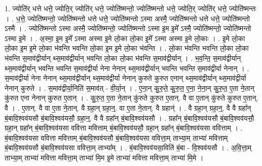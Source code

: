 \documentclass[17pt]{extarticle}
\begin{document}
1. ज्योति॑र् धत्ते धत्ते॒ ज्योति॒र् ज्योति॑र् धत्ते॒ ज्योति॑ष्मन्तो॒ ज्योति॑ष्मन्तो धत्ते॒ ज्योति॒र् ज्योति॑र् धत्ते॒ ज्योति॑ष्मन्तः । . ध॒त्ते॒ ज्योति॑ष्मन्तो॒ ज्योति॑ष्मन्तो धत्ते धत्ते॒ ज्योति॑ष्मन्तो ऽस्मा अस्मै॒ ज्योति॑ष्मन्तो धत्ते धत्ते॒ ज्योति॑ष्मन्तो ऽस्मै । . ज्योति॑ष्मन्तो ऽस्मा अस्मै॒ ज्योति॑ष्मन्तो॒ ज्योति॑ष्मन्तो ऽस्मा इ॒म इ॒मे᳚ ऽस्मै॒ ज्योति॑ष्मन्तो॒ ज्योति॑ष्मन्तो ऽस्मा इ॒मे । . अ॒स्मा॒ इ॒म इ॒मे᳚ ऽस्मा अस्मा इ॒मे लो॒का लो॒का इ॒मे᳚ ऽस्मा अस्मा इ॒मे लो॒काः । . इ॒मे लो॒का लो॒का इ॒म इ॒मे लो॒का भ॑वन्ति भवन्ति लो॒का इ॒म इ॒मे लो॒का भ॑वन्ति । . लो॒का भ॑वन्ति भवन्ति लो॒का लो॒का भ॑वन्ति स॒माव॑द्वीर्यान् थ्स॒माव॑द्वीर्यान् भवन्ति लो॒का लो॒का भ॑वन्ति स॒माव॑द्वीर्यान् । . भ॒व॒न्ति॒ स॒माव॑द्वीर्यान् थ्स॒माव॑द्वीर्यान् भवन्ति भवन्ति स॒माव॑द्वीर्या नेना नेनान् थ्स॒माव॑द्वीर्यान् भवन्ति भवन्ति स॒माव॑द्वीर्या नेनान् । . स॒माव॑द्वीर्या नेना नेनान् थ्स॒माव॑द्वीर्यान् थ्स॒माव॑द्वीर्या नेनान् कुरुते कुरुत एनान् थ्स॒माव॑द्वीर्यान् थ्स॒माव॑द्वीर्या नेनान् कुरुते । . स॒माव॑द्वीर्या॒निति॑ स॒माव॑त् - वी॒र्या॒न् । . ए॒ना॒न् कु॒रु॒ते॒ कु॒रु॒त॒ ए॒ना॒ ने॒ना॒न् कु॒रु॒त॒ ए॒ता ने॒तान् कु॑रुत एना नेनान् कुरुत ए॒तान् । . कु॒रु॒त॒ ए॒ता ने॒तान् कु॑रुते कुरुत ए॒तान्. वै वा ए॒तान् कु॑रुते कुरुत ए॒तान्. वै । . ए॒तान्. वै वा ए॒ता ने॒तान्. वै ग्रहा॒न् ग्रहा॒न्॒. वा ए॒ता ने॒तान्. वै ग्रहान्॑ । . वै ग्रहा॒न् ग्रहा॒न्॒. वै वै ग्रहा᳚न् बं॒बावि॒श्वव॑यसौ बं॒बावि॒श्वव॑यसौ॒ ग्रहा॒न्॒. वै वै ग्रहा᳚न् बं॒बावि॒श्वव॑यसौ । . ग्रहा᳚न् बं॒बावि॒श्वव॑यसौ बं॒बावि॒श्वव॑यसौ॒ ग्रहा॒न् ग्रहा᳚न् बं॒बावि॒श्वव॑यसा ववित्ता मवित्ताम् बं॒बावि॒श्वव॑यसौ॒ ग्रहा॒न् ग्रहा᳚न् बं॒बावि॒श्वव॑यसा ववित्ताम् । . बं॒बावि॒श्वव॑यसा ववित्ता मवित्ताम् बं॒बावि॒श्वव॑यसौ बं॒बावि॒श्वव॑यसा ववित्ता॒म् ताभ्या॒म् ताभ्या॑ मवित्ताम् बं॒बावि॒श्वव॑यसौ बं॒बावि॒श्वव॑यसा ववित्ता॒म् ताभ्या᳚म् । . बं॒बावि॒श्वव॑यसा॒विति॑ बं॒बा - वि॒श्वव॑यसौ । . अ॒वि॒त्ता॒म् ताभ्या॒म् ताभ्या॑ मवित्ता मवित्ता॒म् ताभ्या॑ मि॒म इ॒मे ताभ्या॑ मवित्ता मवित्ता॒म् ताभ्या॑ मि॒मे । \newline
\end{document}
